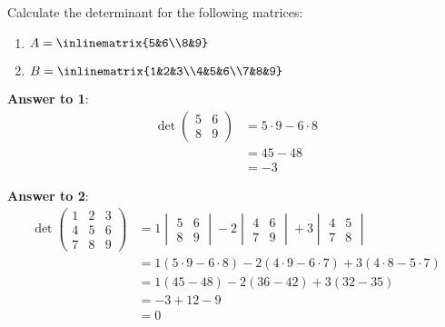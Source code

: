 \begin{exm}\label{exm-eval-determinats}
	Calculate the determinant for the following matrices:
	\begin{enumerate}
		\item $A=\inlinematrix{5&6\\8&9}$
		\item $B=\inlinematrix{1&2&3\\4&5&6\\7&8&9}$
	\end{enumerate}
	\begin{flushleft}
		\textbf{Answer to 1}:
		\begin{align*}
			\det\begin{pmatrix}
				5 & 6 \\
				8 & 9
			\end{pmatrix} & =5\cdot9-6\cdot8 \\
			                              & =45-48           \\
			                              & =-3
		\end{align*}
	\end{flushleft}
	\begin{flushleft}
		\textbf{Answer to 2}:
		\begin{align*}
			\det\begin{pmatrix}
				1 & 2 & 3 \\
				4 & 5 & 6 \\
				7 & 8 & 9
			\end{pmatrix} & =1\begin{vmatrix}
				5 & 6 \\
				8 & 9
			\end{vmatrix}-2\begin{vmatrix}
				4 & 6 \\
				7 & 9
			\end{vmatrix}+3\begin{vmatrix}
				4 & 5 \\
				7 & 8
			\end{vmatrix} \\
			                               & =1(5\cdot9-6\cdot8)-2(4\cdot9-6\cdot7)+3(4\cdot8-5\cdot7)                            \\
			                               & =1(45-48)-2(36-42)+3(32-35)                                                          \\
			                               & =-3+12-9                                                                             \\
			                               & =0
		\end{align*}
	\end{flushleft}
\end{exm}

